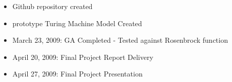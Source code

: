 \begin{itemize}
	\item Github repository created
	\item prototype Turing Machine Model Created
\end{itemize}

\begin{itemize}
	\item March 23, 2009: GA Completed - Tested against Rosenbrock function
	\item April 20, 2009: Final Project Report Delivery
	\item April 27, 2009: Final Project Presentation
\end{itemize}
